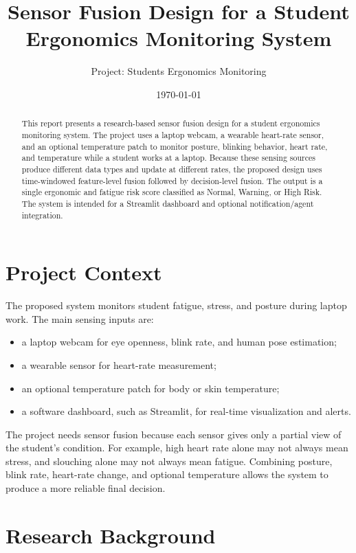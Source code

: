 \documentclass[11pt,a4paper]{article}
\title{Sensor Fusion Design for a Student Ergonomics Monitoring System}
\author{Project: Students Ergonomics Monitoring}
\date{\today}
\begin{document}
\maketitle

\begin{abstract}
This report presents a research-based sensor fusion design for a student ergonomics monitoring system. The project uses a laptop webcam, a wearable heart-rate sensor, and an optional temperature patch to monitor posture, blinking behavior, heart rate, and temperature while a student works at a laptop. Because these sensing sources produce different data types and update at different rates, the proposed design uses time-windowed feature-level fusion followed by decision-level fusion. The output is a single ergonomic and fatigue risk score classified as Normal, Warning, or High Risk. The system is intended for a Streamlit dashboard and optional notification/agent integration.
\end{abstract}

\section{Project Context}
The proposed system monitors student fatigue, stress, and posture during laptop work. The main sensing inputs are:

\begin{itemize}[leftmargin=*]
    \item a laptop webcam for eye openness, blink rate, and human pose estimation;
    \item a wearable sensor for heart-rate measurement;
    \item an optional temperature patch for body or skin temperature;
    \item a software dashboard, such as Streamlit, for real-time visualization and alerts.
\end{itemize}

The project needs sensor fusion because each sensor gives only a partial view of the student's condition. For example, high heart rate alone may not always mean stress, and slouching alone may not always mean fatigue. Combining posture, blink rate, heart-rate change, and optional temperature allows the system to produce a more reliable final decision.

\section{Research Background}
\end{document}
